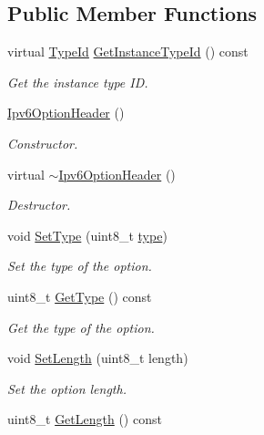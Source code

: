 \subsection*{Public Member Functions}
\begin{DoxyCompactItemize}
\item 
virtual \hyperlink{classns3_1_1TypeId}{Type\+Id} \hyperlink{classns3_1_1Ipv6OptionHeader_a6665d66b92cc7c5791d87380f4320853}{Get\+Instance\+Type\+Id} () const 
\begin{DoxyCompactList}\small\item\em Get the instance type ID. \end{DoxyCompactList}\item 
\hyperlink{classns3_1_1Ipv6OptionHeader_a007d9987ad4afffbe297204451ff00be}{Ipv6\+Option\+Header} ()
\begin{DoxyCompactList}\small\item\em Constructor. \end{DoxyCompactList}\item 
virtual \hyperlink{classns3_1_1Ipv6OptionHeader_a4772429b7ca3a5b878eb5592974c661e}{$\sim$\+Ipv6\+Option\+Header} ()
\begin{DoxyCompactList}\small\item\em Destructor. \end{DoxyCompactList}\item 
void \hyperlink{classns3_1_1Ipv6OptionHeader_a22afaaf64c3fcad433ea7a613c47d4a7}{Set\+Type} (uint8\+\_\+t \hyperlink{visualizer-ideas_8txt_add98db9e15e2a58cf2b57623e7aa893a}{type})
\begin{DoxyCompactList}\small\item\em Set the type of the option. \end{DoxyCompactList}\item 
uint8\+\_\+t \hyperlink{classns3_1_1Ipv6OptionHeader_a1e588558d5a1bc90a1820dc68ff14c65}{Get\+Type} () const 
\begin{DoxyCompactList}\small\item\em Get the type of the option. \end{DoxyCompactList}\item 
void \hyperlink{classns3_1_1Ipv6OptionHeader_a20e4f120d7fc70d2beb9d02bf6101a26}{Set\+Length} (uint8\+\_\+t length)
\begin{DoxyCompactList}\small\item\em Set the option length. \end{DoxyCompactList}\item 
uint8\+\_\+t \hyperlink{classns3_1_1Ipv6OptionHeader_af304328674f97b017180744ed5eb9b12}{Get\+Length} () const 

\end{DoxyCompactItemize}
